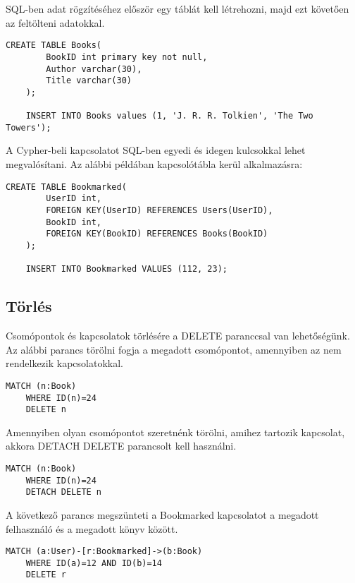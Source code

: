 \bigskip

SQL-ben adat rögzítéséhez először egy táblát kell létrehozni, majd ezt követően az feltölteni adatokkal.
\begin{lstlisting}[columns=fullflexible]
    CREATE TABLE Books(
        BookID int primary key not null,
        Author varchar(30),
        Title varchar(30)
    );
    
    INSERT INTO Books values (1, 'J. R. R. Tolkien', 'The Two Towers');
\end{lstlisting}


\noindent A Cypher-beli kapcsolatot SQL-ben egyedi és idegen kulcsokkal lehet megvalósítani. Az alábbi példában kapcsolótábla kerül alkalmazásra:
\begin{lstlisting}[columns=fullflexible]
    CREATE TABLE Bookmarked(
        UserID int, 
        FOREIGN KEY(UserID) REFERENCES Users(UserID),
        BookID int, 
        FOREIGN KEY(BookID) REFERENCES Books(BookID)
    );
    
    INSERT INTO Bookmarked VALUES (112, 23);

\end{lstlisting}

\subsection{Törlés}
Csomópontok és kapcsolatok törlésére a DELETE paranccsal van lehetőségünk. Az alábbi parancs törölni fogja a megadott csomópontot, amennyiben az nem rendelkezik kapcsolatokkal.
\begin{lstlisting}[columns=fullflexible]
    MATCH (n:Book) 
    WHERE ID(n)=24 
    DELETE n
\end{lstlisting}

Amennyiben olyan csomópontot szeretnénk törölni, amihez tartozik kapcsolat, akkora DETACH DELETE parancsolt kell használni.
\begin{lstlisting}[columns=fullflexible]
    MATCH (n:Book) 
    WHERE ID(n)=24
    DETACH DELETE n
\end{lstlisting}

A következő parancs megszünteti a Bookmarked kapcsolatot a megadott felhasználó és a megadott könyv között.

\begin{lstlisting}[columns=fullflexible]
    MATCH (a:User)-[r:Bookmarked]->(b:Book) 
    WHERE ID(a)=12 AND ID(b)=14
    DELETE r
\end{lstlisting}

